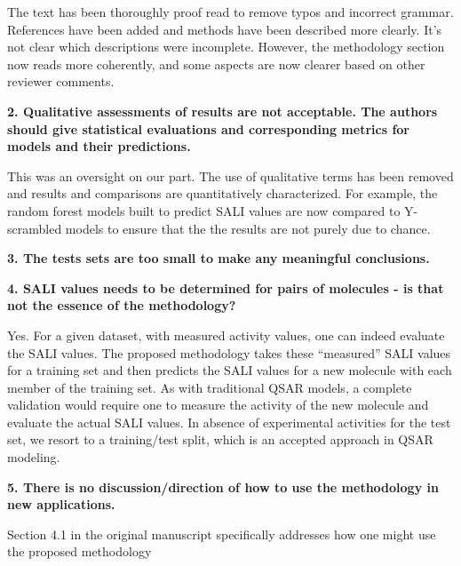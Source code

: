 \documentclass[letterpaper, 12pt]{article}
\begin{document}
The text has been thoroughly proof read to remove typos and incorrect grammar. References have been
added and methods have been described more clearly. It's not clear which descriptions were
incomplete. However, the methodology section now reads more coherently, and some aspects are now
clearer based on other reviewer comments.

\textbf{2.  Qualitative assessments of results are not acceptable.  The authors should give
  statistical evaluations and corresponding metrics for models and their predictions.}

This was an oversight on our part. The use of qualitative terms has been removed and results and
comparisons are quantitatively characterized. For example, the random forest models built to predict
SALI values are now compared to Y-scrambled models to ensure that the the results are not purely due
to chance.

\textbf{3.  The tests sets are too small to make any meaningful conclusions.}

\textbf{4.  SALI values needs to be determined for pairs of molecules - is that not the essence of
  the methodology?}

Yes. For a given dataset, with measured activity values, one can indeed evaluate the SALI
values. The proposed methodology takes these ``measured'' SALI values for a training set and then
predicts the SALI values for a new molecule with each member of the training set. As with
traditional QSAR models, a complete validation would require one to measure the activity of the new
molecule and evaluate the actual SALI values. In absence of experimental activities for the test
set, we resort to a training/test split, which is an accepted approach in QSAR modeling.

\textbf{5.  There is no discussion/direction of how to use the methodology in new applications.}

Section 4.1 in the original manuscript specifically addresses how one might use the proposed
methodology
\end{document}

